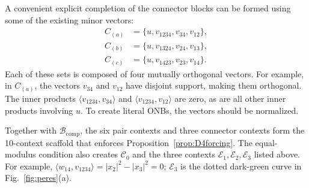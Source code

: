 \documentclass[%
  reprint,
  superscriptaddress,
  showpacs,
  showkeys,
  amsmath,amssymb,
  pra,
  longbibliography,
  floatfix,
  x11names
]{revtex4-2}
\newcommand{\rev}[1]{{\color{revisionblue}#1}}
\begin{document}
A convenient explicit completion of the connector blocks can be formed using some of the existing minor vectors:
\begin{align*}
C_{(a)}&=\{u, v_{1234}, v_{34}, v_{12}\},\\
C_{(b)}&=\{u, v_{1324}, v_{24}, v_{13}\},\\
C_{(c)}&=\{u, v_{1423}, v_{23}, v_{14}\}.
\end{align*}
Each of these sets is composed of four mutually orthogonal vectors. For example, in $C_{(a)}$, the vectors $v_{34}$ and $v_{12}$ have disjoint support,
making them orthogonal. The inner products $\langle v_{1234}, v_{34} \rangle$ and $\langle v_{1234}, v_{12} \rangle$ are zero, as are all other inner products involving $u$. To create literal ONBs, the vectors should be normalized.

\rev{Together with $\mathcal{B}_{\mathrm{comp}}$, the six pair contexts and three connector contexts form the 10-context scaffold that enforces Proposition~\ref{prop:D4forcing}.  The equal-modulus condition also creates $\mathcal{C}_0$ and the three contexts $\mathcal{E}_1,\mathcal{E}_2,\mathcal{E}_3$ listed above.  For example, $\langle w_{14},v_{1234}\rangle=|x_2|^2-|x_3|^2=0$; $\mathcal{E}_3$ is the dotted dark-green curve in Fig.~\ref{fig:peres}(a).}
\end{document}
